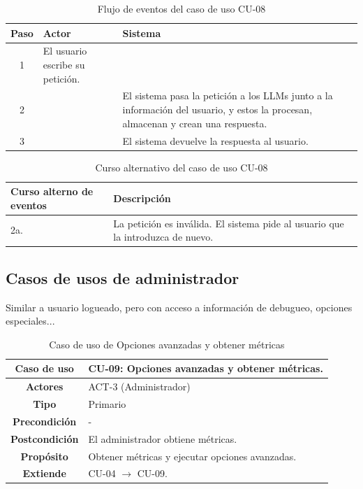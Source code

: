 \begin{table}[H]
\centering
\begin{tabular}{|c|p{5cm}|p{5cm}|}
\hline
\rowcolor{green!40} \textbf{Paso} & \textbf{Actor} & \textbf{Sistema} \\ \hline
\rowcolor{blue!10} 1 & El usuario escribe su petición. &  \\ \hline
\rowcolor{blue!10} 2 &  & El sistema pasa la petición a los LLMs junto a la información del usuario, y estos la procesan, almacenan y crean una respuesta. \\ \hline
\rowcolor{blue!10} 3 &  & El sistema devuelve la respuesta al usuario. \\ \hline
\end{tabular}
\caption{Flujo de eventos del caso de uso CU-08}
\end{table}

\begin{table}[H]
\centering
\begin{tabular}{|p{4cm}|p{8cm}|}
\hline
\rowcolor{green!40} \textbf{Curso alterno de eventos} & \textbf{Descripción} \\ \hline
\rowcolor{blue!10} 2a. & La petición es inválida. El sistema pide  al usuario que la introduzca de nuevo.\\ \hline
\end{tabular}
\caption{Curso alternativo del caso de uso CU-08}
\end{table}
\newpage
\subsection{Casos de usos de administrador}

Similar a usuario logueado, pero con acceso a información de debugueo, opciones especiales...

\begin{table}[H]
\centering
\begin{tabular}{|c|p{10cm}|}
\hline
\rowcolor{green!40} \textbf{Caso de uso} & CU-09: Opciones avanzadas y obtener métricas. \\ \hline
\rowcolor{blue!10} \textbf{Actores} & ACT-3 (Administrador) \\ \hline
\rowcolor{blue!10} \textbf{Tipo} & Primario \\ \hline
\rowcolor{blue!10} \textbf{Precondición} & - \\ \hline
\rowcolor{blue!10} \textbf{Postcondición} & El administrador obtiene métricas. \\ \hline
\rowcolor{blue!10} \textbf{Propósito} & Obtener métricas y ejecutar opciones avanzadas. \\ \hline
\rowcolor{blue!10} \textbf{Extiende} & CU-04 $\rightarrow$ CU-09.\\ \hline
\end{tabular}
\caption{Caso de uso de Opciones avanzadas y obtener métricas}
\end{table}

